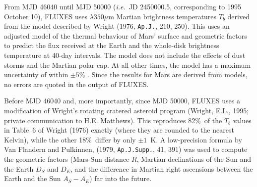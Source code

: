 \documentclass[11pt,twoside]{article}
\renewcommand{\_}{\texttt{\symbol{95}}}
\begin{document}
From MJD 46040 until MJD 50000 ({\em{i.e.}}\ JD 2450000.5, corresponding to 1995
October 10), FLUXES uses $\lambda350\mu$m Martian brightness temperatures
$T_b$ derived from the model described by Wright (1976, {\tt{Ap.J.}}, 210, 250).
This uses an adjusted model of the thermal
behaviour of Mars' surface and geometric factors to predict the flux received at
the Earth and the whole-disk brightness temperature at 40-day intervals. The
model does not include the effects of dust storms and the Martian polar cap. At
all other times, the model has a maximum uncertainty of within $\pm5$\% . Since
the results for Mars are derived from models, no errors are quoted in the output
of FLUXES.

Before MJD 46040 and, more importantly, since MJD 50000, FLUXES uses a
modification of Wright's rotating cratered asteroid program (Wright,
E.L., 1995; private communication to H.E. Matthews). This reproduces
82\%\ of the $T_b$ values in Table~6 of Wright (1976) exactly (where they are
rounded to the nearest Kelvin), while the other 18\%\ differ by only $\pm1$~K.
A low-precision formula by Van Flandern and Pulkinnen,
(1979, {\tt{Ap.J.Supp.}}, 41, 391)
was used to compute the geometric factors (Mars-Sun
distance $R$, Martian declinations of the Sun and the Earth $D_S$ and $D_E$,
and the difference in Martian right ascensions between the Earth and the Sun
$A_S - A_E$) far into the future.
\end{document}
